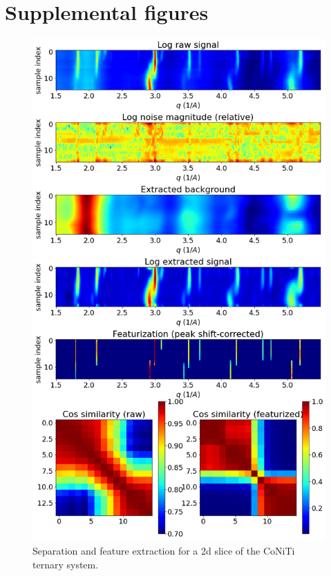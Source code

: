 \documentclass[12pt]{iopart}
\begin{document}
\section{Supplemental figures}
\begin{figure}[h!]
  \centering
    \includegraphics[scale = .5]{paper_figures/pkg/7_composition_summary_peakfit.png}
  \caption{Separation and feature extraction for a 2d slice of the CoNiTi ternary system.}
  \label{fig:7}
\end{figure}
\end{document}
